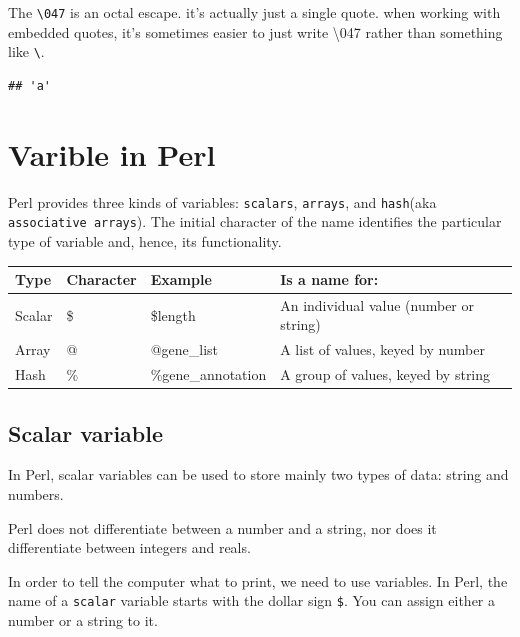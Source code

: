 \documentclass[]{book}
\makeatletter
\newenvironment{Shaded}{\begin{snugshade}}{\end{snugshade}}
\newcommand{\BuiltInTok}[1]{#1}
\newcommand{\FunctionTok}[1]{\textcolor[rgb]{0.00,0.00,0.00}{#1}}
\newcommand{\KeywordTok}[1]{\textcolor[rgb]{0.13,0.29,0.53}{\textbf{#1}}}
\newcommand{\NormalTok}[1]{#1}
\newcommand{\StringTok}[1]{\textcolor[rgb]{0.31,0.60,0.02}{#1}}
\newenvironment{kframe}{%
\medskip{}
\setlength{\fboxsep}{.8em}
 \def\at@end@of@kframe{}%
 \ifinner\ifhmode%
  \def\at@end@of@kframe{\end{minipage}}%
  \begin{minipage}{\columnwidth}%
 \fi\fi%
 \def\FrameCommand##1{\hskip\@totalleftmargin \hskip-\fboxsep
 \colorbox{shadecolor}{##1}\hskip-\fboxsep
     \hskip-\linewidth \hskip-\@totalleftmargin \hskip\columnwidth}%
 \MakeFramed {\advance\hsize-\width
   \@totalleftmargin\z@ \linewidth\hsize
   \@setminipage}}%
 {\par\unskip\endMakeFramed%
 \at@end@of@kframe}
\renewenvironment{Shaded}{\begin{kframe}}{\end{kframe}}
\makeatother
\begin{document}
The \texttt{\textbackslash{}047} is an octal escape. it's actually just a single quote. when working with embedded quotes, it's sometimes easier to just write \textbackslash{}047 rather than something like \texttt{\textquotesingle{}\textbackslash{}\textquotesingle{}\textquotesingle{}}.

\begin{Shaded}
\end{Shaded}

\begin{verbatim}
## 'a'
\end{verbatim}

\hypertarget{varible-in-perl}{%
\chapter{Varible in Perl}\label{varible-in-perl}}

Perl provides three kinds of variables: \texttt{scalars}, \texttt{arrays}, and \texttt{hash}(aka \texttt{associative\ arrays}). The initial character of the name identifies the particular type of variable and, hence, its functionality.

\begin{longtable}[]{@{}llll@{}}
\toprule
Type & Character & Example & Is a name for:\tabularnewline
\midrule
\endhead
Scalar & \$ & \$length & An individual value (number or string)\tabularnewline
Array & @ & @gene\_list & A list of values, keyed by number\tabularnewline
Hash & \% & \%gene\_annotation & A group of values, keyed by string\tabularnewline
\bottomrule
\end{longtable}

\hypertarget{scalar-variable}{%
\section{Scalar variable}\label{scalar-variable}}

In Perl, scalar variables can be used to store mainly two types of data: string and numbers.

Perl does not differentiate between a number and a string, nor does it differentiate between integers and reals.

In order to tell the computer what to print, we need to use variables. In Perl, the name of a \texttt{scalar} variable starts with the dollar sign \texttt{\$}. You can assign either a number or a string to it.
\end{document}

